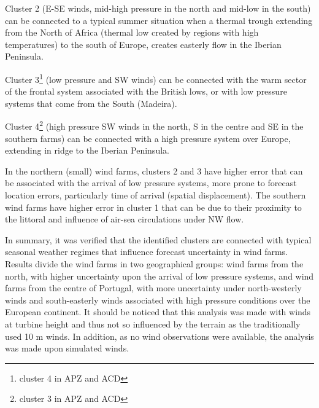Cluster 2 (E-SE winds, mid-high pressure in the north and mid-low in the south) can be connected to a typical summer situation when a thermal trough extending from the North of Africa (thermal low created by regions with high temperatures) to the south of Europe, creates easterly flow in the Iberian Peninsula. 

Cluster 3\footnote{cluster 4 in APZ and ACD} (low pressure and SW winds) can be connected with the warm sector of the frontal system associated with the British lows, or with low pressure systems that come from the South (Madeira).

Cluster 4\footnote{cluster 3 in APZ and ACD} (high pressure SW winds in the north, S in the centre and SE in the southern farms) can be connected with a high pressure system over Europe, extending in ridge to the Iberian Peninsula.

In the northern (small) wind farms, clusters 2 and 3 have higher error that can be associated with the arrival of low pressure systems, more prone to forecast location errors, particularly time of arrival (spatial displacement). The southern wind farms have higher error in cluster 1 that can be due to their proximity to the littoral and influence of air-sea circulations under NW flow.


In summary, it was verified that the identified clusters are connected with typical seasonal weather regimes that influence forecast uncertainty in wind farms. Results divide the wind farms in two geographical groups: wind farms from the north, with higher uncertainty upon the arrival of low pressure systems, and wind farms from the centre of Portugal, with more uncertainty under north-westerly winds and south-easterly winds associated with high pressure conditions over the European continent. It should be noticed that this analysis was made with winds at turbine height and thus not so influenced by the terrain as the traditionally used 10 m winds. In addition, as no wind observations were available, the analysis was made upon simulated winds.
